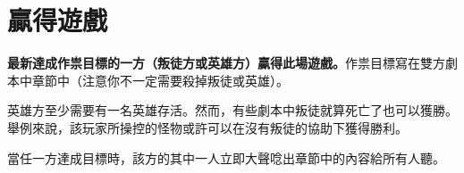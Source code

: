 
\section{贏得遊戲} \label{sec:win}

\textbf{最新達成作祟目標的一方（叛徒方或英雄方）贏得此場遊戲。}作祟目標寫在雙方劇本中章節中（注意你不一定需要殺掉叛徒或英雄）。

英雄方至少需要有一名英雄存活。然而，有些劇本中叛徒就算死亡了也可以獲勝。舉例來說，該玩家所操控的怪物或許可以在沒有叛徒的協助下獲得勝利。

當任一方達成目標時，該方的其中一人立即大聲唸出章節中的內容給所有人聽。
